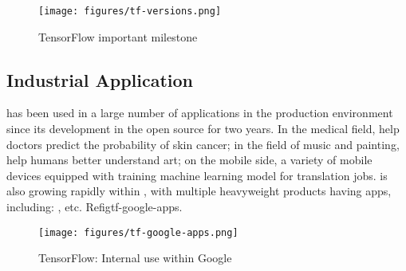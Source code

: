 \begin{content}
\begin{figure}[!htbp]
\centering
\texttt{[image: figures/tf-versions.png]}
\caption{TensorFlow important milestone}
 \label{fig:tf-versions}
\end{figure}

\subsection{Industrial Application}

 has been used in a large number of applications in the production environment since its development in the open source for two years. In the medical field, help doctors predict the probability of skin cancer; in the field of music and painting, help humans better understand art; on the mobile side, a variety of mobile devices equipped with  training machine learning model for translation jobs.  is also growing rapidly within , with multiple heavyweight products having apps, including: , etc. Refig{tf-google-apps}.

\begin{figure}[!htbp]
\centering
\texttt{[image: figures/tf-google-apps.png]}
\caption{TensorFlow: Internal use within Google}
 \label{fig:tf-google-apps}
\end{figure}

\end{content}